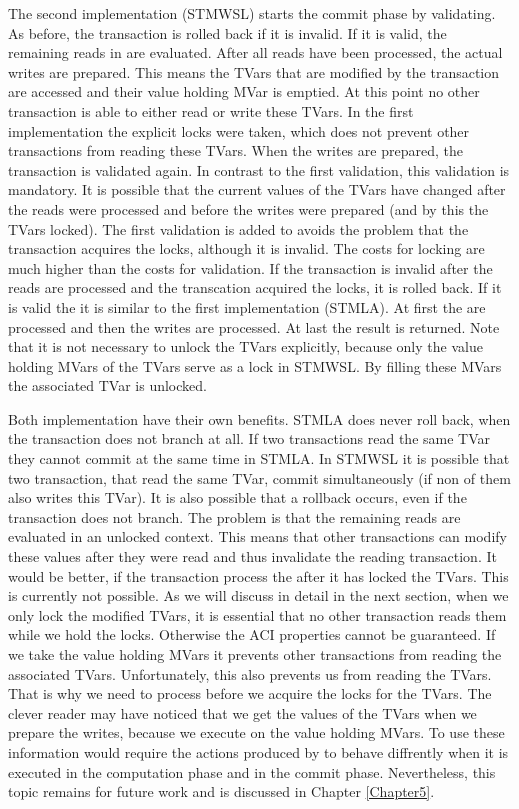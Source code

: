 The second implementation (STMWSL) starts the commit phase by validating. As before, the 
transaction is rolled back if it is invalid. If it is valid, the remaining reads in 
 are evaluated. After all reads have been processed, the actual writes are
prepared. This means the TVars that are modified by the transaction are accessed and
their value holding MVar is emptied. At this point no other transaction is able to 
either read or write these TVars. In the first implementation the explicit locks 
were taken, which does not prevent other transactions from reading these TVars.
When the writes are prepared, the transaction is validated again. In contrast to 
the first validation, this validation is mandatory. It is possible that the current
values of the TVars have changed after the reads were processed and before the 
writes were prepared (and by this the TVars locked). The first validation is
added to avoids the problem that the transaction acquires the locks, although it 
is invalid. The costs for locking are much higher than the costs for validation.
If the transaction is invalid after the reads are processed and the transcation
acquired the locks, it is rolled back. If it is valid the it is similar to
the first implementation (STMLA). At first the  are processed
and then the writes are processed. At last the result is returned. Note that
it is not necessary to unlock the TVars explicitly, because only the value 
holding MVars of the TVars serve as a lock in STMWSL. By filling these MVars
the associated TVar is unlocked. 

Both implementation have their own benefits. STMLA does never roll back,
when the transaction does not branch at all. If two transactions read the
same TVar they cannot commit at the same time in STMLA. In STMWSL it is
possible that two transaction, that read the same TVar, commit simultaneously
(if non of them also writes this TVar). It is also possible
that a rollback occurs, even if the transaction does not branch. The 
problem is that the remaining reads are evaluated in an unlocked context.
This means that other transactions can modify these values after they were 
read and thus invalidate the reading transaction. It would be better, if the
transaction process the  after it has locked the TVars. This is 
currently not possible. As we will discuss in detail in the next section, when 
we only lock the modified TVars, it is essential that no other transaction 
reads them while we hold the locks. Otherwise the ACI properties cannot be 
guaranteed. If we take the value holding MVars it prevents other transactions
from reading the associated TVars. Unfortunately, this also prevents us from 
reading the TVars. That is why we need to process  before we 
acquire the locks for the TVars. The clever reader may have noticed that 
we get the values of the TVars when we prepare the writes, because we execute
 on the value holding MVars. To use these information would 
require the  actions produced by  to 
behave diffrently when it is executed in the computation phase and in the 
commit phase. Nevertheless, this topic remains for future work and is discussed 
in Chapter \ref{Chapter5}.

